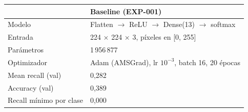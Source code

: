 \begin{tabular}{ll}
\toprule
 & Baseline (EXP-001) \\
\midrule
Modelo & Flatten $\rightarrow$ ReLU $\rightarrow$ Dense(13) $\rightarrow$ softmax \\
Entrada & 224 $\times$ 224 $\times$ 3, píxeles en [0, 255] \\
Parámetros & 1\,956\,877 \\
Optimizador & Adam (AMSGrad), lr $10^{-3}$, batch 16, 20 épocas \\
Mean recall (val) & 0,282 \\
Accuracy (val) & 0,389 \\
Recall mínimo por clase & 0,000 \\
\bottomrule
\end{tabular}
